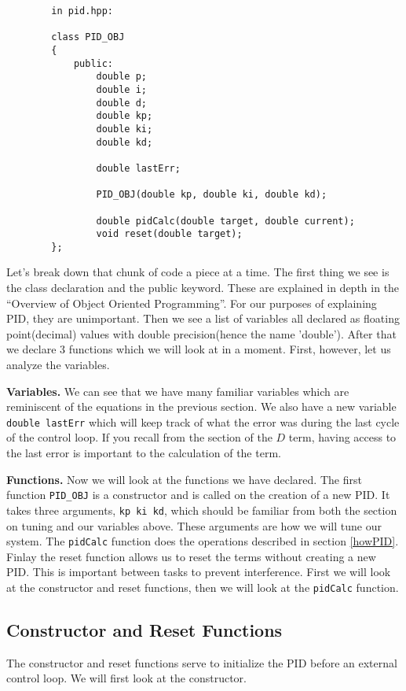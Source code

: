 \documentclass[12pt]{article}
\begin{document}
    \begin{verbatim}
        in pid.hpp:

        class PID_OBJ
        {
            public:
                double p;
                double i;
                double d;
                double kp;
                double ki;
                double kd;

                double lastErr;

                PID_OBJ(double kp, double ki, double kd);

                double pidCalc(double target, double current);
                void reset(double target);
        };
    \end{verbatim}

    Let's break down that chunk of code a piece at a time. The first thing we see is the class declaration and the public keyword. These are explained in depth in the ``Overview of Object Oriented Programming''. For our purposes of explaining PID, they are unimportant. Then we see a list of variables all declared as floating point(decimal) values with double precision(hence the name 'double'). After that we declare 3 functions which we will look at in a moment. First, however, let us analyze the variables.

   \textbf{Variables.} We can see that we have many familiar variables which are reminiscent of the equations in the previous section. We also have a new variable \verb|double lastErr| which will keep track of what the error was during the last cycle of the control loop. If you recall from the section of the $D$ term, having access to the last error is important to the calculation of the term.

    \textbf{Functions.} Now we will look at the functions we have declared. The first function \verb|PID_OBJ| is a constructor and is called on the creation of a new PID. It takes three arguments, \verb|kp ki kd|, which should be familiar from both the section on tuning and our variables above. These arguments are how we will tune our system. The \verb|pidCalc| function does the operations described in section \ref{howPID}. Finlay the reset function allows us to reset the terms without creating a new PID. This is important between tasks to prevent interference. First we will look at the constructor and reset functions, then we will look at the \verb|pidCalc| function.

\subsection{Constructor and Reset Functions}
    The constructor and reset functions serve to initialize the PID before an external control loop. We will first look at the constructor.
\end{document}
